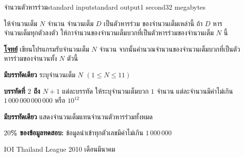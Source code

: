 \documentclass[11pt,a4paper]{article}
\begin{document}
\begin{problem}{จำนวนตัวหารร่วม}{standard input}{standard output}{1 second}{32 megabytes}

ให้จำนวนเต็ม $N$ จำนวน จำนวนเต็ม $D$ เป็นตัวหารร่วม ของจำนวนเต็มเหล่านี้ ถ้า $D$ หารจำนวนเต็มทุกตัวลงตัว ให้กาจำนวนของจำนวนเต็มบวกที่เป็นตัวหารร่วมของจำนวนเต็ม $N$ นี้

                

\bigskip
\underline{\textbf{โจทย์}}  เขียนโปรแกรมรับจำนวนเต็ม $N$ จำนวน จากนั้นคำนวณจำนวนของจำนวนเต็มบวกที่เป็นตัวหารร่วมของจำนวนทั้ง $N$ ตัวนี้


\InputFile

\textbf{มีบรรทัดเดียว} ระบุจำนวนเต็ม $N$ $( 1 \leq N \leq 11 )$ 

\textbf{บรรทัดที่ $2$ ถึง $N+1$} แต่ละบรรทัด ให้ระบุจำนวนเต็มบวก $1$ จำนวน แต่ละจำนวนมีค่าไม่เกิน $1\,000\,000\,000\,000$ หรือ $10^{12}$


\OutputFile

\textbf{มีบรรทัดเดียว} แสดงจำนวนเต็มแทนจำนวนตัวหารร่วมทั้งหมด

\Examples

\begin{example}
%
%
\end{example}

\Scoring

\textbf{$20$\% ของข้อมูลทดสอบ:} ข้อมูลนำเข้าทุกตัวเลขมีค่าไม่เกิน $1\,000\,000$

\Source

IOI Thailand League 2010 เดือนมีนาคม

\end{problem}
\end{document}
